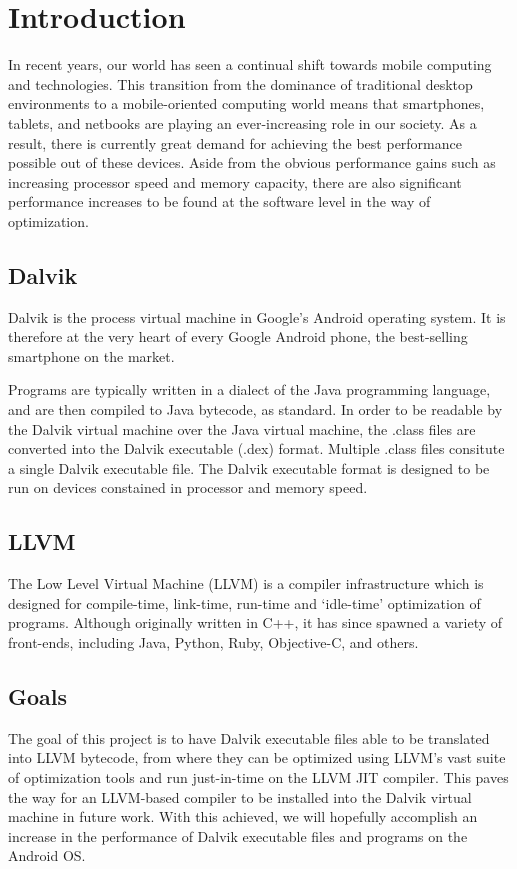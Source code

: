 \chapter{Introduction}

In recent years, our world has seen a continual shift towards mobile computing and technologies. This transition from the dominance of traditional desktop environments to a mobile-oriented computing world means that smartphones, tablets, and netbooks are playing an ever-increasing role in our society. As a result, there is currently great demand for achieving the best performance possible out of these devices. Aside from the obvious performance gains such as increasing processor speed and memory capacity, there are also significant performance increases to be found at the software level in the way of optimization.

\section{Dalvik}

Dalvik is the process virtual machine in Google's Android operating system. It is therefore at the very heart of every Google Android phone, the best-selling smartphone on the market\footnotemark {}.


Programs are typically written in a dialect of the Java programming language, and are then compiled to Java bytecode, as standard. In order to be readable by the Dalvik virtual machine over the Java virtual machine, the .class files are converted into the Dalvik executable (.dex) format. Multiple .class files consitute a single Dalvik executable file. The Dalvik executable format is designed to be run on devices constained in processor and memory speed.

\section{LLVM}

The Low Level Virtual Machine (LLVM) is a compiler infrastructure which is designed for compile-time, link-time, run-time and `idle-time' optimization of programs. Although originally written in C++, it has since spawned a variety of front-ends, including Java, Python, Ruby, Objective-C, and others.

\section{Goals}

The goal of this project is to have Dalvik executable files able to be translated into LLVM bytecode, from where they can be optimized using LLVM's vast suite of optimization tools and run just-in-time on the LLVM JIT compiler. This paves the way for an LLVM-based compiler to be installed into the Dalvik virtual machine in future work. With this achieved, we will hopefully accomplish an increase in the performance of Dalvik executable files and programs on the Android OS.
